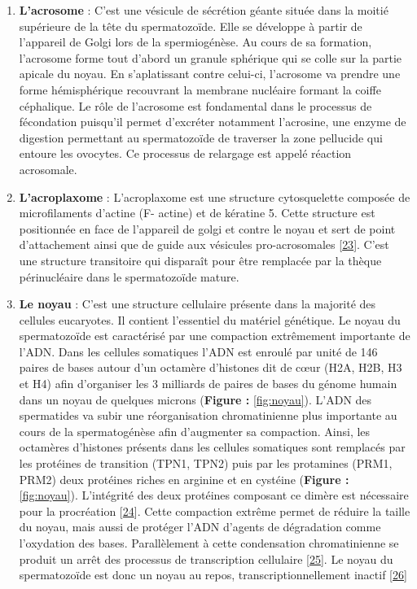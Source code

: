 \documentclass[12pt,twoside]{reedthesis}
\providecommand{\tightlist}{%
  \setlength{\itemsep}{0pt}\setlength{\parskip}{0pt}}
\theoremstyle{definition}
\theoremstyle{definition}
\theoremstyle{remark}
\begin{document}
  \begin{enumerate}
  \def\labelenumi{\arabic{enumi}.}
  \tightlist
  \item
    \textbf{L'acrosome} : C'est une vésicule de sécrétion géante située
    dans la moitié supérieure de la tête du spermatozoïde. Elle se
    développe à partir de l'appareil de Golgi lors de la spermiogénèse. Au
    cours de sa formation, l'acrosome forme tout d'abord un granule
    sphérique qui se colle sur la partie apicale du noyau. En
    s'aplatissant contre celui-ci, l'acrosome va prendre une forme
    hémisphérique recouvrant la membrane nucléaire formant la coiffe
    céphalique. Le rôle de l'acrosome est fondamental dans le processus de
    fécondation puisqu'il permet d'excréter notamment l'acrosine, une
    enzyme de digestion permettant au spermatozoïde de traverser la zone
    pellucide qui entoure les ovocytes. Ce processus de relargage est
    appelé réaction acrosomale.\\
  \item
    \textbf{L'acroplaxome} : L'acroplaxome est une structure cytosquelette
    composée de microfilaments d'actine (F- actine) et de kératine 5.
    Cette structure est positionnée en face de l'appareil de golgi et
    contre le noyau et sert de point d'attachement ainsi que de guide aux
    vésicules pro-acrosomales
    {[}\protect\hyperlink{ref-Kierszenbaum2004}{23}{]}. C'est une
    structure transitoire qui disparaît pour être remplacée par la thèque
    périnucléaire dans le spermatozoïde mature.\\
  \item
    \textbf{Le noyau} : C'est une structure cellulaire présente dans la
    majorité des cellules eucaryotes. Il contient l'essentiel du matériel
    génétique. Le noyau du spermatozoïde est caractérisé par une
    compaction extrêmement importante de l'ADN. Dans les cellules
    somatiques l'ADN est enroulé par unité de 146 paires de bases autour
    d'un octamère d'histones dit de cœur (H2A, H2B, H3 et H4) afin
    d'organiser les 3 milliards de paires de bases du génome humain dans
    un noyau de quelques microns (\textbf{Figure : }\ref{fig:noyau}).
    L'ADN des spermatides va subir une réorganisation chromatinienne plus
    importante au cours de la spermatogénèse afin d'augmenter sa
    compaction. Ainsi, les octamères d'histones présents dans les cellules
    somatiques sont remplacés par les protéines de transition (TPN1, TPN2)
    puis par les protamines (PRM1, PRM2) deux protéines riches en arginine
    et en cystéine (\textbf{Figure : }\ref{fig:noyau}). L'intégrité des
    deux protéines composant ce dimère est nécessaire pour la procréation
    {[}\protect\hyperlink{ref-Cho2001}{24}{]}. Cette compaction extrême
    permet de réduire la taille du noyau, mais aussi de protéger l'ADN
    d'agents de dégradation comme l'oxydation des bases. Parallèlement à
    cette condensation chromatinienne se produit un arrêt des processus de
    transcription cellulaire
    {[}\protect\hyperlink{ref-Kierszenbaum1978}{25}{]}. Le noyau du
    spermatozoïde est donc un noyau au repos, transcriptionnellement
    inactif {[}\protect\hyperlink{ref-Ward1994}{26}{]}
  \end{enumerate}
  
\end{document}
